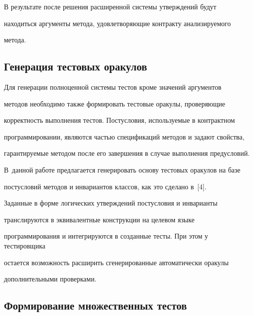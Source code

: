      В результате после решения расширенной системы утверждений будут


находиться аргументы метода, удовлетворяющие контракту анализируемого


метода.





      \vspace*{-6pt}





      \subsection{Генерация тестовых оракулов}





     Для генерации полноценной системы тестов кроме значений аргументов


методов необходимо также формировать тестовые оракулы, проверяющие


корректность выполнения тестов. Постусловия, используемые в контрактном


программировании, являются частью спецификаций методов и задают свойства,


гарантируемые методом после его завершения в случае выполнения предусловий.


В~данной работе предлагается генерировать основу тестовых оракулов на базе


постусловий методов и инвариантов классов, как это сделано в~[4].





     Заданные в форме логических утверждений постусловия и инварианты


транслируются в эквивалентные конструкции на целевом языке


программирования и интегрируются в созданные тесты. При этом у тестировщика


остается возможность расширить сгенерированные автоматически оракулы


дополнительными проверками.





      \vspace*{-6pt}





      \subsection{Формирование множественных тестов}





